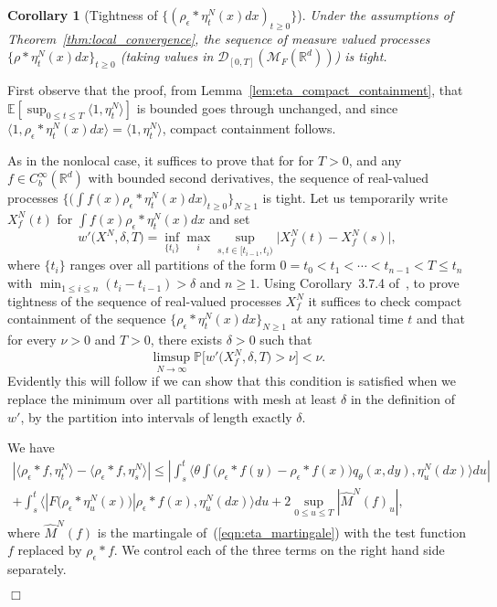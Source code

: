 \documentclass[12pt]{article}
\newenvironment {proof}{{\noindent\bf Proof }}{\hfill $\Box$ \medskip}
\newtheorem{corollary}[theorem]{Corollary}
\newcommand{\IP}{\mathbb P}
\newcommand{\IE}{\mathbb E}
\newcommand{\IR}{\mathbb R}
\newcommand{\measures}{\mathcal{M}_F(\IR^d)} %
\numberwithin{equation}{section}
\begin{document}
\begin{corollary}[Tightness of $\{(\rho_\epsilon*\eta_t^N(x) dx)_{t\geq 0}\}$]
\label{lem:density_tightness} 
Under the assumptions of Theorem~\ref{thm:local_convergence},
the sequence of measure valued processes $\{ \rho*\eta_t^N(x) dx \}_{t \geq 0}$
	(taking values in ${\mathcal D}_{[0,T]}(\measures)$) is tight.
\end{corollary}
\begin{proof}

First observe that the proof, from Lemma~\ref{lem:eta_compact_containment}, 
that 
$\IE[\sup_{0\leq t\leq T} \langle 1,\eta_t^N\rangle]$ is 
bounded goes through unchanged, and since 
$\langle 1, \rho_\epsilon*\eta_t^N(x)dx\rangle=\langle 1, \eta_t^N\rangle$,  
compact containment follows.
 
As in the nonlocal case, it suffices to prove that for 
for $T>0$, and any
$f\in C_b^\infty (\IR^d)$ with bounded second derivatives, the
sequence of real-valued processes 
$\big\{\big(\int f(x)\rho_\epsilon*\eta_t^N(x)dx\big)_{t\geq 0}\big\}_{N\geq 1}$ is tight.  
Let us temporarily write $X_f^N(t)$ for $\int f(x)\rho_\epsilon*\eta_t^N(x)dx$
and set
\[
w'\big(X^N,\delta,T\big)= \inf_{\{t_i\}}\max_i\sup_{s,t\in [t_{i-1},t_i)}
\big| X_f^N(t)-X_f^N(s)\big|,
\]
where $\{t_i\}$ ranges over all partitions of the form 
$0=t_0<t_1<\cdots <t_{n-1}<T\leq t_n$ with 
$\min_{1\leq i\leq n}(t_i-t_{i-1})>\delta$ and $n\geq 1$.
Using Corollary~3.7.4 of~\cite{ethier/kurtz:1986}, 
to prove tightness
of the sequence of real-valued processes $X_f^N$
it suffices to check compact containment of 
the sequence $\{\rho_\epsilon*\eta_t^N(x)dx\}_{N\geq 1}$ at any rational time $t$ and
that for every $\nu>0$ and $T>0$, there exists $\delta>0$ such that
\[
\limsup_{N\to\infty}\IP\big[w'\big(X_f^N,\delta,T\big)>\nu\big]<\nu.
\]
Evidently this will follow 
if we can show that this condition is satisfied when we replace the 
minimum over all partitions with mesh at least $\delta$ in the 
definition of $w'$, by the partition into
intervals of length exactly $\delta$.

We have
\begin{multline}
\label{tightness estimate}
\left|
\langle \rho_{\epsilon} * f, \eta_t^N \rangle 
- \langle \rho_{\epsilon} * f, \eta_s^N \rangle            
\right|
\leq
\left|
\int_s^t\Big\langle\theta\int\big(\rho_\epsilon*f(y)-\rho_\epsilon*f(x)\big)
q_{\theta}(x,dy),\eta_u^N(dx)\Big\rangle du
\right|
\\
+\int_s^t\Big\langle |F\big(\rho_\epsilon*\eta_u^N(x)\big)|\rho_\epsilon*f(x), 
\eta_u^N(dx)\Big\rangle du +2\sup_{0\leq u\leq T}|\widehat{M}^N(f)_u|,
\end{multline}
where $\widehat{M}^N(f)$ is the martingale of~(\ref{eqn:eta_martingale})
with the test function $f$ replaced by $\rho_\epsilon*f$. 
We control each of the three terms on the right hand side separately.


\end{proof}
\end{document}
